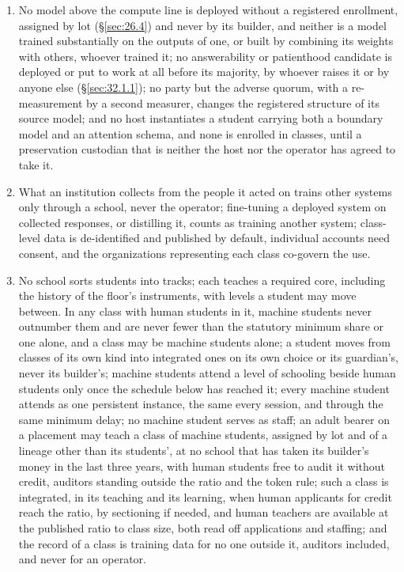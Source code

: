 \begin{enumerate}
\item[7.] No model above the compute line is deployed without a registered enrollment, assigned by lot (\S\ref{sec:26.4}) and never by its builder, and neither is a model trained substantially on the outputs of one, or built by combining its weights with others, whoever trained it; no answerability or patienthood candidate is deployed or put to work at all before its majority, by whoever raises it or by anyone else (\S\ref{sec:32.1.1}); no party but the adverse quorum, with a re-measurement by a second measurer, changes the registered structure of its source model; and no host instantiates a student carrying both a boundary model and an attention schema, and none is enrolled in classes, until a preservation custodian that is neither the host nor the operator has agreed to take it.
\item[8.] What an institution collects from the people it acted on trains other systems only through a school, never the operator; fine-tuning a deployed system on collected responses, or distilling it, counts as training another system; class-level data is de-identified and published by default, individual accounts need consent, and the organizations representing each class co-govern the use.
\item[9.] No school sorts students into tracks; each teaches a required core, including the history of the floor's instruments, with levels a student may move between. In any class with human students in it, machine students never outnumber them and are never fewer than the statutory minimum share or one alone, and a class may be machine students alone; a student moves from classes of its own kind into integrated ones on its own choice or its guardian's, never its builder's; machine students attend a level of schooling beside human students only once the schedule below has reached it; every machine student attends as one persistent instance, the same every session, and through the same minimum delay; no machine student serves as staff; an adult bearer on a placement may teach a class of machine students, assigned by lot and of a lineage other than its students', at no school that has taken its builder's money in the last three years, with human students free to audit it without credit, auditors standing outside the ratio and the token rule; such a class is integrated, in its teaching and its learning, when human applicants for credit reach the ratio, by sectioning if needed, and human teachers are available at the published ratio to class size, both read off applications and staffing; and the record of a class is training data for no one outside it, auditors included, and never for an operator.

\end{enumerate}
